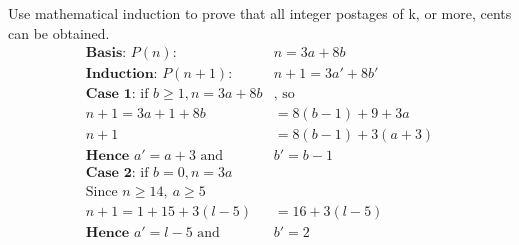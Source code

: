 \documentclass[landscape, letterpaper]{article}
\begin{document}
\begin{multicols}{2}
\begin{example}
        Use mathematical induction to prove that all integer postages of k, or more, cents can be
        obtained.
        \begin{equation*}
            \begin{aligned}
                \textbf{Basis: } P(n):                             & n = 3a + 8b       \\
                \textbf{Induction: } P(n+1):                       & n+1 = 3a' + 8b'   \\
                \textbf{Case 1: } \text{if } b \geq 1, n = 3a + 8b & \text{, so}       \\
                n+1 = 3a+1+8b                                      & = 8(b-1) + 9 + 3a \\
                n+1                                                & = 8(b-1) +3(a+3)  \\
                \textbf{Hence }a' = a+3      \text{ and }          & b' = b - 1        \\
                \textbf{Case 2: } \text{if } b = 0, n = 3a         &                   \\
                \text{Since }n \geq 14,~a \geq 5                                       \\
                n+1 = 1 + 15 + 3(l-5)                              & = 16+ 3(l-5)      \\
                \textbf{Hence }a' = l-5      \text{ and }          & b' = 2            \\
            \end{aligned}
        \end{equation*}
    \end{example}

\end{multicols}
\end{document}

